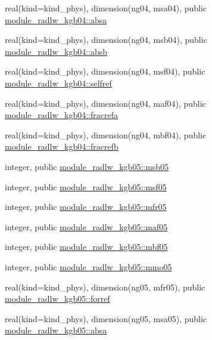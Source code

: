 \begin{DoxyCompactItemize}
\item 
real(kind=kind\+\_\+phys), dimension(ng04, msa04), public \hyperlink{group__module__radlw__main_ga8d73bb6971c872e15a24a81d3917167e}{module\+\_\+radlw\+\_\+kgb04\+::absa}
\item 
real(kind=kind\+\_\+phys), dimension(ng04, msb04), public \hyperlink{group__module__radlw__main_gaaacc55911b42c67396b5cdc4318e0d5f}{module\+\_\+radlw\+\_\+kgb04\+::absb}
\item 
real(kind=kind\+\_\+phys), dimension(ng04, msf04), public \hyperlink{group__module__radlw__main_ga696b91ef86ccbda17df10f770797cafa}{module\+\_\+radlw\+\_\+kgb04\+::selfref}
\item 
real(kind=kind\+\_\+phys), dimension(ng04, maf04), public \hyperlink{group__module__radlw__main_gace1d87742e2c543d9b0662e1c7d2b624}{module\+\_\+radlw\+\_\+kgb04\+::fracrefa}
\item 
real(kind=kind\+\_\+phys), dimension(ng04, mbf04), public \hyperlink{group__module__radlw__main_gae8d5d56d09dfbe06d918c6b098e3fddf}{module\+\_\+radlw\+\_\+kgb04\+::fracrefb}
\item 
integer, public \hyperlink{group__module__radlw__main_ga0f3b6573bfe94c5a5968cda2dc8b1adf}{module\+\_\+radlw\+\_\+kgb05\+::msb05}
\item 
integer, public \hyperlink{group__module__radlw__main_ga1c9a43b7011e7328fa62d3ecd29acc73}{module\+\_\+radlw\+\_\+kgb05\+::msf05}
\item 
integer, public \hyperlink{group__module__radlw__main_ga44f07da9a7f99377f7d331249c475b80}{module\+\_\+radlw\+\_\+kgb05\+::mfr05}
\item 
integer, public \hyperlink{group__module__radlw__main_gaba904215976d7f4316b52c8f0cffe595}{module\+\_\+radlw\+\_\+kgb05\+::maf05}
\item 
integer, public \hyperlink{group__module__radlw__main_ga57db9a9cb9acac604df555038f6127a3}{module\+\_\+radlw\+\_\+kgb05\+::mbf05}
\item 
integer, public \hyperlink{group__module__radlw__main_gaa552aae4878030144218ca6c2bbe417f}{module\+\_\+radlw\+\_\+kgb05\+::mmo05}
\item 
real(kind=kind\+\_\+phys), dimension(ng05, mfr05), public \hyperlink{group__module__radlw__main_ga6ff0c311db14b41c9bdf1170164adc3a}{module\+\_\+radlw\+\_\+kgb05\+::forref}
\item 
real(kind=kind\+\_\+phys), dimension(ng05, msa05), public \hyperlink{group__module__radlw__main_ga30ce809b40dd99b3219996ac8f023274}{module\+\_\+radlw\+\_\+kgb05\+::absa}
\item 

\end{DoxyCompactItemize}

